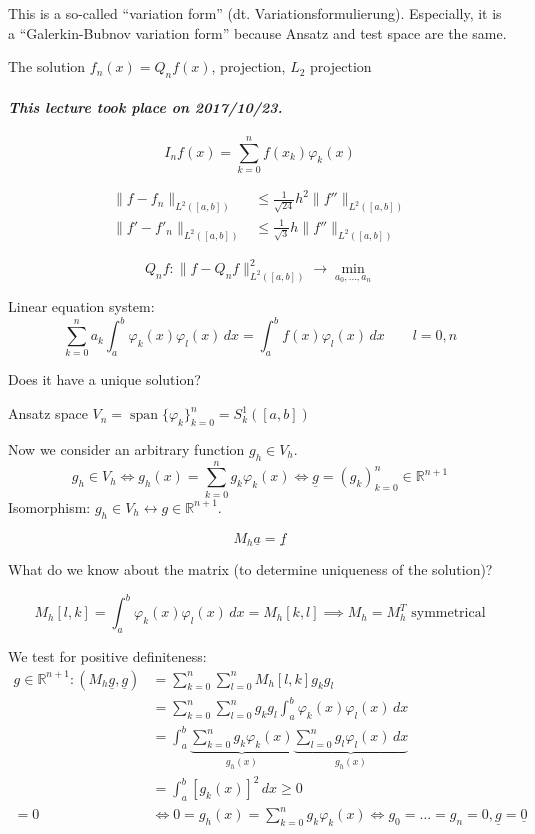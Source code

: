 \documentclass{article}
\newcommand{\dateref}[1]{\paragraph{\textit{This lecture took place on #1.}}}
\begin{document}
This is a so-called \enquote{variation form} (dt. Variationsformulierung). Especially, it is a \enquote{Galerkin-Bubnov variation form} because Ansatz and test space are the same. %

The solution $f_n(x) = Q_n f(x)$, projection, $L_2$ projection

\dateref{2017/10/23}

\[ I_n f(x) = \sum_{k=0}^n f(x_k) \varphi_k(x) \]

\begin{align*}
  \|f - f_n\|_{L^2([a,b])} &\leq \frac{1}{\sqrt{24}} h^2 \|f''\|_{L^2([a,b])} \\
  \|f' - f'_n\|_{L^2([a,b])} &\leq \frac{1}{\sqrt3} h \| f'' \|_{L^2([a,b])}
\end{align*}

\[ Q_nf: \| f - Q_n f \|^2_{L^2([a,b])} \to \min_{a_0,\ldots,a_n} \]

Linear equation system:
\[ \sum_{k=0}^n a_k \int_a^b \varphi_k(x) \varphi_l(x) \, dx = \int_a^b f(x) \varphi_l(x) \, dx \qquad l = 0, n \]

Does it have a unique solution?

Ansatz space $V_n = \operatorname{span}\{\varphi_k\}_{k=0}^n = S_k^1([a,b])$

Now we consider an arbitrary function $g_h \in V_h$.
\[ g_h \in V_h \Leftrightarrow g_h(x) = \sum_{k=0}^n g_k \varphi_k(x) \Leftrightarrow \underline{g} = (g_k)_{k=0}^n \in \mathbb R^{n+1} \]
Isomorphism: $g_h \in V_h \leftrightarrow g \in \mathbb R^{n+1}$.

\[ M_h \underline{a} = \underline{f} \]

What do we know about the matrix (to determine uniqueness of the solution)?

\[ M_h[l,k] = \int_a^b \varphi_k(x) \varphi_l(x) \, dx = M_h [k,l] \implies M_h = M_h^T \text{ symmetrical} \]

We test for positive definiteness:  %
\begin{align*}
  g \in \mathbb R^{n+1}: \left(M_h \underline{g}, \underline{g}\right)
    &= \sum_{k=0}^n \sum_{l=0}^n M_h[l,k] g_k g_l \\
    &= \sum_{k=0}^n \sum_{l=0}^n g_k g_l \int_a^b \varphi_k(x) \varphi_l(x) \, dx \\
    &= \int_a^b \underbrace{\sum_{k=0}^n g_k \varphi_k(x)}_{g_h(x)} \underbrace{\sum_{l=0}^n g_l \varphi_l(x) \, dx}_{g_h(x)} \\
    &= \int_a^b \left[g_k(x)\right]^2 \, dx \geq 0 \\
  = 0 &\Leftrightarrow 0 = g_h(x) = \sum_{k=0}^n g_k \varphi_k(x) \Leftrightarrow g_0 = \ldots = g_n = 0, \underline{g} = \underline{0}
\end{align*}
\end{document}
